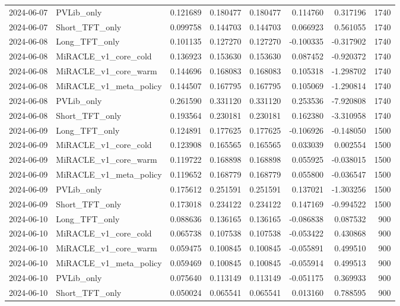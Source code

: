 \begin{tabular}{llrrrrrr}
2024-06-07 & PVLib_only & 0.121689 & 0.180477 & 0.180477 & 0.114760 & 0.317196 & 1740 \\
2024-06-07 & Short_TFT_only & 0.099758 & 0.144703 & 0.144703 & 0.066923 & 0.561055 & 1740 \\
2024-06-08 & Long_TFT_only & 0.101135 & 0.127270 & 0.127270 & -0.100335 & -0.317902 & 1740 \\
2024-06-08 & MiRACLE_v1_core_cold & 0.136923 & 0.153630 & 0.153630 & 0.087452 & -0.920372 & 1740 \\
2024-06-08 & MiRACLE_v1_core_warm & 0.144696 & 0.168083 & 0.168083 & 0.105318 & -1.298702 & 1740 \\
2024-06-08 & MiRACLE_v1_meta_policy & 0.144507 & 0.167795 & 0.167795 & 0.105069 & -1.290814 & 1740 \\
2024-06-08 & PVLib_only & 0.261590 & 0.331120 & 0.331120 & 0.253536 & -7.920808 & 1740 \\
2024-06-08 & Short_TFT_only & 0.193564 & 0.230181 & 0.230181 & 0.162380 & -3.310958 & 1740 \\
2024-06-09 & Long_TFT_only & 0.124891 & 0.177625 & 0.177625 & -0.106926 & -0.148050 & 1500 \\
2024-06-09 & MiRACLE_v1_core_cold & 0.123908 & 0.165565 & 0.165565 & 0.033039 & 0.002554 & 1500 \\
2024-06-09 & MiRACLE_v1_core_warm & 0.119722 & 0.168898 & 0.168898 & 0.055925 & -0.038015 & 1500 \\
2024-06-09 & MiRACLE_v1_meta_policy & 0.119652 & 0.168779 & 0.168779 & 0.055800 & -0.036547 & 1500 \\
2024-06-09 & PVLib_only & 0.175612 & 0.251591 & 0.251591 & 0.137021 & -1.303256 & 1500 \\
2024-06-09 & Short_TFT_only & 0.173018 & 0.234122 & 0.234122 & 0.147169 & -0.994522 & 1500 \\
2024-06-10 & Long_TFT_only & 0.088636 & 0.136165 & 0.136165 & -0.086838 & 0.087532 & 900 \\
2024-06-10 & MiRACLE_v1_core_cold & 0.065738 & 0.107538 & 0.107538 & -0.053422 & 0.430868 & 900 \\
2024-06-10 & MiRACLE_v1_core_warm & 0.059475 & 0.100845 & 0.100845 & -0.055891 & 0.499510 & 900 \\
2024-06-10 & MiRACLE_v1_meta_policy & 0.059469 & 0.100845 & 0.100845 & -0.055914 & 0.499513 & 900 \\
2024-06-10 & PVLib_only & 0.075640 & 0.113149 & 0.113149 & -0.051175 & 0.369933 & 900 \\
2024-06-10 & Short_TFT_only & 0.050024 & 0.065541 & 0.065541 & 0.013160 & 0.788595 & 900 \\

\end{tabular}
